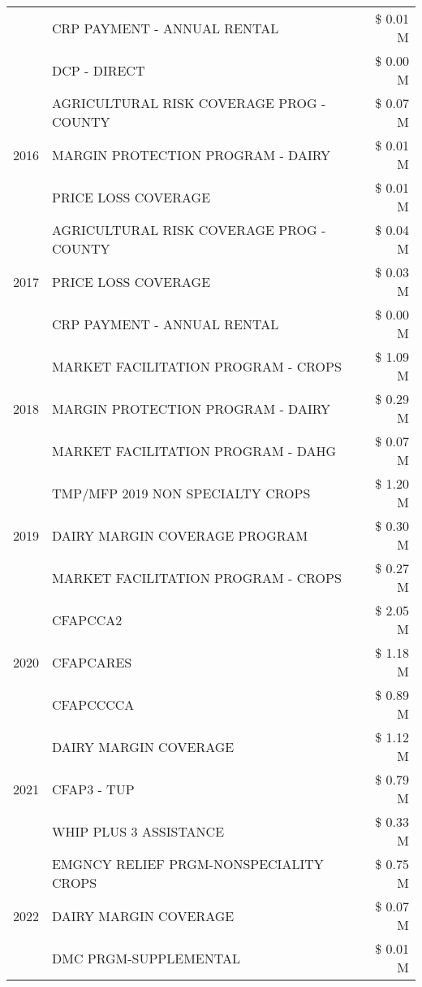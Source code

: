 \begin{tabular}{llr}
 & CRP PAYMENT - ANNUAL RENTAL & \$ 0.01 M \\
 & DCP - DIRECT & \$ 0.00 M \\
\cline{1-3}
\multirow[t]{3}{*}{2016} & AGRICULTURAL RISK COVERAGE PROG - COUNTY & \$ 0.07 M \\
 & MARGIN PROTECTION PROGRAM - DAIRY & \$ 0.01 M \\
 & PRICE LOSS COVERAGE & \$ 0.01 M \\
\cline{1-3}
\multirow[t]{3}{*}{2017} & AGRICULTURAL RISK COVERAGE PROG - COUNTY & \$ 0.04 M \\
 & PRICE LOSS COVERAGE & \$ 0.03 M \\
 & CRP PAYMENT - ANNUAL RENTAL & \$ 0.00 M \\
\cline{1-3}
\multirow[t]{3}{*}{2018} & MARKET FACILITATION PROGRAM - CROPS & \$ 1.09 M \\
 & MARGIN PROTECTION PROGRAM - DAIRY & \$ 0.29 M \\
 & MARKET FACILITATION PROGRAM - DAHG & \$ 0.07 M \\
\cline{1-3}
\multirow[t]{3}{*}{2019} & TMP/MFP 2019 NON SPECIALTY CROPS & \$ 1.20 M \\
 & DAIRY MARGIN COVERAGE PROGRAM & \$ 0.30 M \\
 & MARKET FACILITATION PROGRAM - CROPS & \$ 0.27 M \\
\cline{1-3}
\multirow[t]{3}{*}{2020} & CFAPCCA2 & \$ 2.05 M \\
 & CFAPCARES & \$ 1.18 M \\
 & CFAPCCCCA & \$ 0.89 M \\
\cline{1-3}
\multirow[t]{3}{*}{2021} & DAIRY MARGIN COVERAGE & \$ 1.12 M \\
 & CFAP3 - TUP & \$ 0.79 M \\
 & WHIP PLUS 3 ASSISTANCE & \$ 0.33 M \\
\cline{1-3}
\multirow[t]{3}{*}{2022} & EMGNCY RELIEF PRGM-NONSPECIALITY CROPS & \$ 0.75 M \\
 & DAIRY MARGIN COVERAGE & \$ 0.07 M \\
 & DMC PRGM-SUPPLEMENTAL & \$ 0.01 M \\
\cline{1-3}
\bottomrule
\end{tabular}
